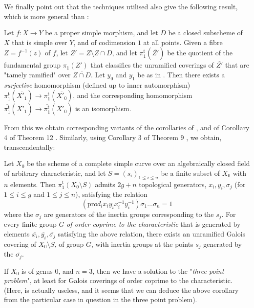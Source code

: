 We finally point out that the techniques utilised also give the following result, which is more general than :

\begin{theorem}\label{fga2-theorem-14}
    Let $f\colon X\to Y$ be a proper simple morphism, and let $D$ be a closed subscheme of $X$ that is simple over $Y$, and of codimension $1$ at all points.
    Given a fibre $Z=f^{-1}(z)$ of $f$, let $Z'=Z\setminus Z\cap D$, and let $\pi_1^\mathrm{t}(\overline{Z'})$ be the quotient of the fundamental group $\pi_1(Z')$ that classifies the unramified coverings of $\overline{Z'}$ that are "tamely ramified" over $\overline{Z\cap D}$.
    Let $y_0$ and $y_1$ be as in .
    Then there exists a \emph{surjective} homomorphism (defined up to inner automorphism) $\pi_1^\mathrm{t}(\overline{X'_1})\to\pi_1^\mathrm{t}(\overline{X'_0})$, and the corresponding homomorphism $\overline{\pi_1^\mathrm{t}}(\overline{X'_1})\to\overline{\pi_1^\mathrm{t}}(\overline{X'_0})$ is an isomorphism.
\end{theorem}

From this we obtain corresponding variants of the corollaries of , and of Corollary 4 of Theorem 12 .
Similarly, using Corollary 3 of Theorem 9 , we obtain, transcendentally:


\begin{corollary}\label{fga2-theorem-14-corollary-1}
    Let $X_0$ be the scheme of a complete simple curve over an algebraically closed field of arbitrary characteristic, and let $S=(s_i)_{1\leqslant i\leqslant n}$ be a finite subset of $X_0$ with $n$ elements.
    Then $\pi_1^\mathrm{t}(X_0\setminus S)$ admits $2g+n$ topological generators, $x_i,y_i,\sigma_j$ (for $1\leqslant i\leqslant g$ and $1\leqslant j\leqslant n$), satisfying the relation
    \[\left(\mathrm{pr}od_i x_iy_ix_i^{-1}y_i^{-1}\right)\sigma_1\ldots\sigma_n = 1\]
    where the $\sigma_j$ are generators of the inertia groups corresponding to the $s_j$.
    For every finite group $G$ \emph{of order coprime to the characteristic} that is generated by elements $\overline{x_i},\overline{y_i},\overline{\sigma_j}$ satisfying the above relation, there exists an unramified Galois covering of $X_0\setminus S$, of group $G$, with inertia groups at the points $s_j$ generated by the $\overline{\sigma_j}$.
\end{corollary}

If $X_0$ is of genus $0$, and $n=3$, then we have a solution to the "\emph{three point problem}", at least for Galois coverings of order coprime to the characteristic.
(Here,  is actually useless, and it seems that we can deduce the above corollary from the particular case in question in the three point problem).

